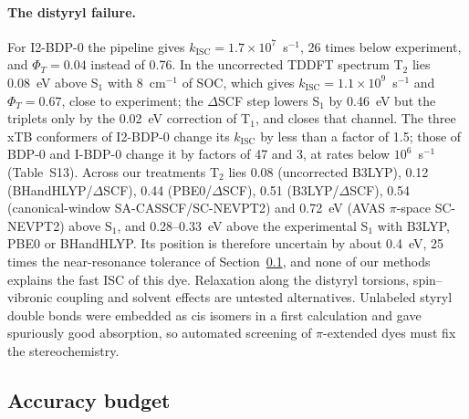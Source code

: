 \documentclass[journal=jctcce,manuscript=article]{achemso}
\newcommand{\kisc}{k_\mathrm{ISC}}
\begin{document}
\paragraph{The distyryl failure.} For I2-BDP-0 the pipeline gives
$\kisc=1.7\times10^{7}$~s$^{-1}$, 26 times below experiment, and $\Phi_T=0.04$ instead of 0.76. In the
uncorrected TDDFT spectrum T$_2$ lies 0.08~eV above S$_1$ with 8~cm$^{-1}$ of SOC, which gives
$\kisc=1.1\times10^{9}$~s$^{-1}$ and $\Phi_T=0.67$, close to experiment; the $\Delta$SCF step lowers S$_1$
by 0.46~eV but the triplets only by the 0.02~eV correction of T$_1$, and closes that channel. The three xTB conformers of I2-BDP-0 change its $\kisc$ by less than a factor of 1.5; those of BDP-0 and I-BDP-0
change it by factors of 47 and 3, at rates below $10^{6}$~s$^{-1}$ (Table~S13). Across
our treatments T$_2$ lies 0.08 (uncorrected B3LYP), 0.12 (BHandHLYP/$\Delta$SCF), 0.44 (PBE0/$\Delta$SCF),
0.51 (B3LYP/$\Delta$SCF), 0.54 (canonical-window SA-CASSCF/SC-NEVPT2) and 0.72~eV (AVAS $\pi$-space SC-NEVPT2)
above S$_1$, and 0.28--0.33~eV above the experimental S$_1$ with B3LYP, PBE0 or BHandHLYP. Its position is therefore uncertain by about 0.4~eV, 25 times
the near-resonance tolerance of Section~\ref{sec:budget}, and none of our methods explains the fast ISC of
this dye. Relaxation along the distyryl torsions, spin--vibronic coupling and solvent effects are untested
alternatives. Unlabeled styryl double bonds were embedded as cis isomers in a first calculation and gave
spuriously good absorption, so automated screening of $\pi$-extended dyes must fix the stereochemistry.

\subsection{Accuracy budget}
\label{sec:budget}
\end{document}
